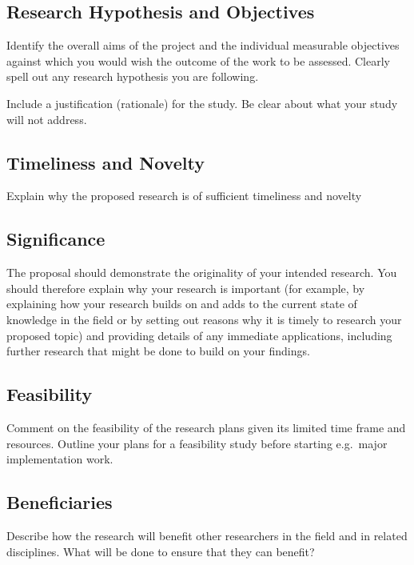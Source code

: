 \subsection{Research Hypothesis and Objectives}\label{subsec:research-hypothesis-and-objectives}

Identify the overall aims of the project and the individual measurable objectives against which you would
wish the outcome of the work to be assessed.
Clearly spell out any research hypothesis you are following.

Include a justification (rationale) for the study.
Be clear about what your study will not address.


\subsection{Timeliness and Novelty}\label{subsec:timeliness-and-novelty}

Explain why the proposed research is of sufficient timeliness and novelty

\subsection{Significance}\label{subsec:significance}

The proposal should demonstrate the originality of your intended research.
You should therefore explain why your research is important
(for example, by explaining how your research builds on and adds to the current state of knowledge in the field or
by setting out reasons why it is timely to research your proposed topic) and providing details of any
immediate applications, including further research that might be done to build on your findings.

\subsection{Feasibility}\label{subsec:feasibility}

Comment on the feasibility of the research plans given its limited time frame and resources.
Outline your plans for a feasibility study before starting e.g.\ major implementation work.

\subsection{Beneficiaries}\label{subsec:beneficiaries}

Describe how the research will benefit other researchers in the field and in related disciplines.
What will be done to ensure that they can benefit?
